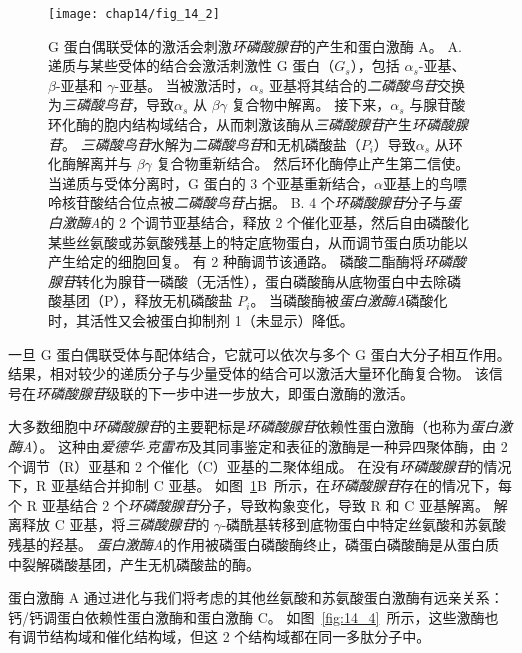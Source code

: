 \begin{figure}[htbp]
	\centering
	\texttt{[image: chap14/fig\_14\_2]}
	\caption{G 蛋白偶联受体的激活会刺激\textit{环磷酸腺苷}的产生和蛋白激酶 A\cite{alberts2017molecular}。
		A. 递质与某些受体的结合会激活刺激性 G 蛋白（$ G_s $），包括 $\alpha_s$-亚基、$\beta$-亚基和 $\gamma$-亚基。
		当被激活时，$\alpha_s$ 亚基将其结合的\textit{二磷酸鸟苷}交换为\textit{三磷酸鸟苷}，导致$\alpha_s$ 从 $\beta \gamma$ 复合物中解离。
		接下来，$\alpha_s$ 与腺苷酸环化酶的胞内结构域结合，从而刺激该酶从\textit{三磷酸腺苷}产生\textit{环磷酸腺苷}。
		\textit{三磷酸鸟苷}水解为\textit{二磷酸鸟苷}和无机磷酸盐（$ P_i $）导致$\alpha_s$ 从环化酶解离并与 $\beta \gamma$ 复合物重新结合。
		然后环化酶停止产生第二信使。
		当递质与受体分离时，G 蛋白的 3 个亚基重新结合，$\alpha$亚基上的鸟嘌呤核苷酸结合位点被\textit{二磷酸鸟苷}占据。
		B. 4 个\textit{环磷酸腺苷}分子与\textit{蛋白激酶A}的 2 个调节亚基结合，释放 2 个催化亚基，然后自由磷酸化某些丝氨酸或苏氨酸残基上的特定底物蛋白，从而调节蛋白质功能以产生给定的细胞回复。
		有 2 种酶调节该通路。
		磷酸二酯酶将\textit{环磷酸腺苷}转化为腺苷一磷酸（无活性），蛋白磷酸酶从底物蛋白中去除磷酸基团（P），释放无机磷酸盐 $ P_i $。
		当磷酸酶被\textit{蛋白激酶A}磷酸化时，其活性又会被蛋白抑制剂 1（未显示）降低。}
	\label{fig:14_2}
\end{figure}


一旦 G 蛋白偶联受体与配体结合，它就可以依次与多个 G 蛋白大分子相互作用。
结果，相对较少的递质分子与少量受体的结合可以激活大量环化酶复合物。
该信号在\textit{环磷酸腺苷}级联的下一步中进一步放大，即蛋白激酶的激活。


大多数细胞中\textit{环磷酸腺苷}的主要靶标是\textit{环磷酸腺苷}依赖性蛋白激酶（也称为\textit{蛋白激酶A}）。
这种由\textit{爱德华$\cdot$克雷布}及其同事鉴定和表征的激酶是一种异四聚体酶，由 2 个调节（R）亚基和 2 个催化（C）亚基的二聚体组成。
在没有\textit{环磷酸腺苷}的情况下，R 亚基结合并抑制 C 亚基。
如图~\ref{fig:14_2}B~所示，在\textit{环磷酸腺苷}存在的情况下，每个 R 亚基结合 2 个\textit{环磷酸腺苷}分子，导致构象变化，导致 R 和 C 亚基解离。
解离释放 C 亚基，将\textit{三磷酸腺苷}的 $\gamma$-磷酰基转移到底物蛋白中特定丝氨酸和苏氨酸残基的羟基。
\textit{蛋白激酶A}的作用被磷蛋白磷酸酶终止，磷蛋白磷酸酶是从蛋白质中裂解磷酸基团，产生无机磷酸盐的酶。


蛋白激酶 A 通过进化与我们将考虑的其他丝氨酸和苏氨酸蛋白激酶有远亲关系：钙/钙调蛋白依赖性蛋白激酶和蛋白激酶 C。
如图~\ref{fig:14_4}~所示，这些激酶也有调节结构域和催化结构域，但这 2 个结构域都在同一多肽分子中。



